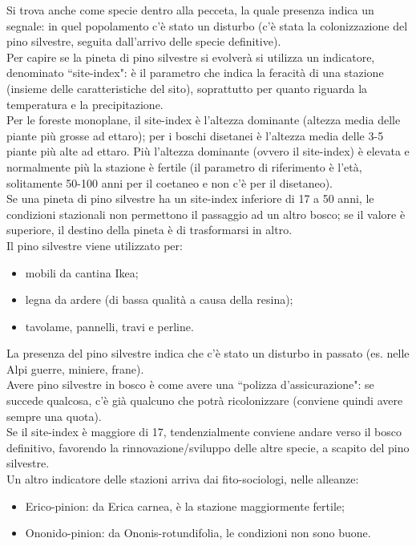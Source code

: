 Si trova anche come specie dentro alla pecceta, la quale presenza indica un segnale: in quel popolamento c'è stato un disturbo (c'è stata la colonizzazione del pino silvestre, seguita dall'arrivo delle specie definitive).\\
Per capire se la pineta di pino silvestre si evolverà si utilizza un indicatore, denominato ``site-index": è il parametro che indica la feracità di una stazione (insieme delle caratteristiche del sito), soprattutto per quanto riguarda la temperatura e la precipitazione.\\ Per le foreste monoplane, il site-index è l'altezza dominante (altezza media delle piante più grosse ad ettaro); per i boschi disetanei è l'altezza media delle 3-5 piante più alte ad ettaro. Più l'altezza dominante (ovvero il site-index) è elevata e normalmente più la stazione è fertile (il parametro di riferimento è l'età, solitamente 50-100 anni per il coetaneo e non c'è per il disetaneo).\\
Se una pineta di pino silvestre ha un site-index inferiore di 17 a 50 anni, le condizioni stazionali non permettono il passaggio ad un altro bosco; se il valore è superiore, il destino della pineta è di trasformarsi in altro.\\
Il pino silvestre viene utilizzato per:
\begin{itemize}[nosep]
    \item mobili da cantina Ikea;
    \item legna da ardere (di bassa qualità a causa della resina);
    \item tavolame, pannelli, travi e perline.
\end{itemize}
La presenza del pino silvestre indica che c'è stato un disturbo in passato (es. nelle Alpi guerre, miniere, frane).\\
Avere pino silvestre in bosco è come avere una ``polizza d'assicurazione": se succede qualcosa, c'è già qualcuno che potrà ricolonizzare (conviene quindi avere sempre una quota).\\
Se il site-index è maggiore di 17, tendenzialmente conviene andare verso il bosco definitivo, favorendo la rinnovazione/sviluppo delle altre specie, a scapito del pino silvestre.\\
Un altro indicatore delle stazioni arriva dai fito-sociologi, nelle alleanze:
\begin{itemize}[nosep]
    \item Erico-pinion: da Erica carnea, è la stazione maggiormente fertile;
    \item Ononido-pinion: da Ononis-rotundifolia, le condizioni non sono buone.
\end{itemize}
